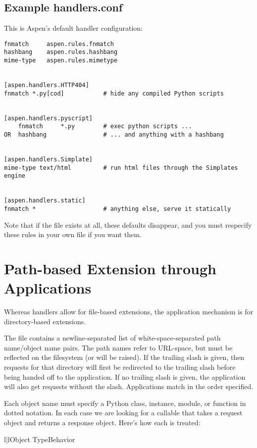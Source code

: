 \subsection{Example handlers.conf \label{handlers.conf}}
This is Aspen's default handler configuration:

\begin{verbatim}
fnmatch     aspen.rules.fnmatch
hashbang    aspen.rules.hashbang
mime-type   aspen.rules.mimetype


[aspen.handlers.HTTP404]
fnmatch *.py[cod]           # hide any compiled Python scripts


[aspen.handlers.pyscript]
    fnmatch     *.py        # exec python scripts ...
OR  hashbang                # ... and anything with a hashbang


[aspen.handlers.Simplate]
mime-type text/html         # run html files through the Simplates engine


[aspen.handlers.static]
fnmatch *                   # anything else, serve it statically
\end{verbatim}

Note that if the file  exists at all, these defaults
disappear, and you must respecify these rules in your own file if you want them.

\section{Path-based Extension through Applications}

Whereas handlers allow for file-based extensions, the application mechanism is
for directory-based extensions.

The  file contains a newline-separated list of
white-space-separated path name/object name pairs. The path names refer to
URL-space, but must be reflected on the filesystem (or 
will be raised). If the trailing slash is given, then requests for that
directory will first be redirected to the trailing slash before being handed off
to the application. If no trailing slash is given, the application will also get
requests without the slash. Applications match in the order specified.

Each object name must specify a Python class, instance, module, or
function in dotted notation. In each case we are looking for a callable
that takes a request object and returns a response object. Here's how
each is treated:

\begin{tableii}{l|l}{}{Object Type}{Behavior}
\end{tableii}


